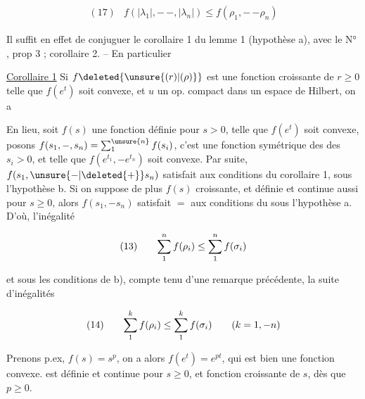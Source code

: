 \[
\begin{array}{ll}
(17) & \displaystyle f(|\lambda_1|,\mathord{-}\,\mathord{-},|\lambda_n|)\leq f(\rho_1,\mathord{-}\,\mathord{-}\rho_n)
\end{array}
\]

Il suffit en effet de conjuguer le corollaire 1 du lemme 1  (hypothèse a), avec le N° , prop 3 ; corollaire 2. -- En particulier

\uline{Corollaire 1} Si $f\deleted{\unsure{(r)|(\rho)}}$ est une fonction  croissante de $r\geq0$ telle que $f(e^t)$ soit convexe, et $u$ un op. compact dans un espace de Hilbert, on a

\reversemarginpar{}\normalmarginpar


En  lieu, soit $f(s)$ une fonction définie pour $s>0$, telle que $f(e^t)$ soit convexe, posons $f(s_1,\mathord{-},s_n)=\sum_1^{\unsure{n}} f(s_i)$, c'est une fonction symétrique des  des $s_i>0$, et telle que $f(e^{t_1},\mathord{-}e^{t_n})$ soit convexe. Par suite,  $f(s_1,\unsure{\mathord{-}|\deleted{+}}s_n)$ satisfait aux conditions du corollaire 1, sous l'hypothèse b. Si on suppose de plus $f(s)$ croissante, et définie et continue aussi pour $s\geq0$, alors $f(s_1,\mathord{-}s_n)$ satisfait $=$ aux conditions du  sous l'hypothèse a. D'où,    l'inégalité

\[
\begin{array}{@{}l@{\qquad}l@{}}
(13)&\displaystyle \sum_1^n f(\rho_i)\leq\sum_1^n f(\sigma_i)
\end{array}
\]

et sous les conditions de b), compte tenu d'une remarque précédente, la suite d'inégalités

\[
\begin{array}{@{}l@{\qquad}l@{}}
(14)&\displaystyle \sum_1^k f(\rho_i)\leq\sum_1^k f(\sigma_i)\qquad(k=1,\mathord{-}n)
\end{array}
\]

Prenons p.ex,  $f(s)=s^p$,  on a alors $f(e^t)=e^{pt}$, qui est bien une fonction convexe.  est définie et  continue pour $s\geq0$, et  fonction croissante de $s$, dès que $p\geq0$. 

